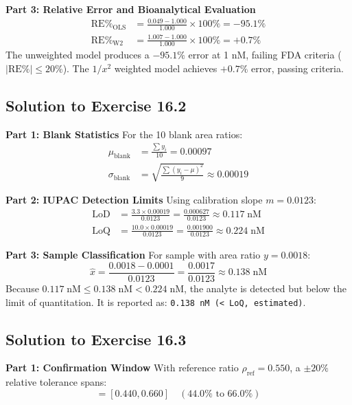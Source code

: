 \documentclass[11pt,twoside,openright]{book}
\begin{document}
\noindent\textbf{Part 3: Relative Error and Bioanalytical Evaluation}\enspace
\begin{align*}
\text{RE}\%_{\text{OLS}} &= \frac{0.049 - 1.000}{1.000} \times 100\% = -95.1\% \\
\text{RE}\%_{\text{W2}}  &= \frac{1.007 - 1.000}{1.000} \times 100\% = +0.7\%
\end{align*}
The unweighted model produces a $-95.1\%$ error at 1 nM, failing FDA criteria ($|\text{RE}\%| \le 20\%$). The $1/x^2$ weighted model achieves $+0.7\%$ error, passing criteria.

\subsection{Solution to Exercise 16.2}

\noindent\textbf{Part 1: Blank Statistics}\enspace
For the 10 blank area ratios:
\begin{align*}
\mu_{\text{blank}} &= \frac{\sum y_i}{10} = 0.00097 \\
\sigma_{\text{blank}} &= \sqrt{\frac{\sum (y_i - \mu)^2}{9}} \approx 0.00019
\end{align*}

\noindent\textbf{Part 2: IUPAC Detection Limits}\enspace
Using calibration slope $m = 0.0123$:
\begin{align*}
\text{LoD} &= \frac{3.3 \times 0.00019}{0.0123} = \frac{0.000627}{0.0123} \approx 0.117\;\text{nM} \\
\text{LoQ} &= \frac{10.0 \times 0.00019}{0.0123} = \frac{0.001900}{0.0123} \approx 0.224\;\text{nM}
\end{align*}

\noindent\textbf{Part 3: Sample Classification}\enspace
For sample with area ratio $y = 0.0018$:
\begin{equation*}
\hat{x} = \frac{0.0018 - 0.0001}{0.0123} = \frac{0.0017}{0.0123} \approx 0.138\;\text{nM}
\end{equation*}
Because $0.117\;\text{nM} \le 0.138\;\text{nM} < 0.224\;\text{nM}$, the analyte is detected but below the limit of quantitation. It is reported as: \texttt{0.138 nM (< LoQ, estimated)}.

\subsection{Solution to Exercise 16.3}

\noindent\textbf{Part 1: Confirmation Window}\enspace
With reference ratio $\rho_{\text{ref}} = 0.550$, a $\pm 20\%$ relative tolerance spans:
\begin{equation*}
[0.550 \times 0.80, 0.550 \times 1.20] = [0.440, 0.660] \quad (44.0\% \text{ to } 66.0\%)
\end{equation*}
\end{document}
